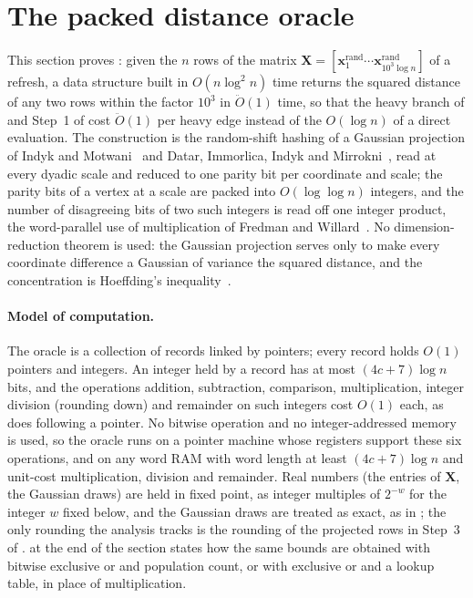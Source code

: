 \documentclass[11pt]{article}
\theoremstyle{remark}
\newcommand{\xx}{\mathbf x}
\newcommand{\XX}{\mathbf X}
\newcommand{\xxrand}{\xx^{\mathrm{rand}}}
\newcommand{\Odouble}{\ddot{O}}
\begin{document}



\clearpage
\appendix
\section{The packed distance oracle}\label{sec:packed}

This section proves : given the $n$ rows of the matrix
$\XX=[\xxrand_1\cdots\xxrand_{10^{3}\log n}]$ of a refresh, a data structure
built in $O(n\log^{2}n)$ time returns the squared distance of any two rows
within the factor $10^{3}$ in $\Odouble(1)$ time, so that the heavy branch of
 and Step~1 of  cost $\Odouble(1)$ per heavy
edge instead of the $O(\log n)$ of a direct evaluation.
The construction is the random-shift hashing of a Gaussian projection of
Indyk and Motwani~\cite{IM98:conf} and Datar, Immorlica, Indyk and
Mirrokni~\cite{DIIM04:conf}, read at every dyadic scale and reduced to
one parity bit per coordinate and scale; the parity bits of a vertex at a
scale are packed into $O(\log\log n)$ integers, and the number of
disagreeing bits of two such integers is read off one integer product,
the word-parallel use of multiplication of Fredman and
Willard~\cite{FW93:journal}.
No dimension-reduction theorem is used: the Gaussian projection serves
only to make every coordinate difference a Gaussian of variance the
squared distance, and the concentration is Hoeffding's
inequality~\cite{H63:journal}.

\paragraph{Model of computation.}
The oracle is a collection of records linked by pointers; every record
holds $O(1)$ pointers and integers.
An integer held by a record has at most $(4c+7)\log n$ bits, and the
operations addition, subtraction, comparison, multiplication, integer
division (rounding down) and remainder on such integers cost $O(1)$ each,
as does following a pointer.
No bitwise operation and no integer-addressed memory is used, so the
oracle runs on a pointer machine whose registers support these six
operations, and on any word RAM with word length at least $(4c+7)\log n$
and unit-cost multiplication, division and remainder.
Real numbers (the entries of $\XX$, the Gaussian draws) are held in fixed
point, as integer multiples of $2^{-w}$ for the integer $w$ fixed below, and
the Gaussian draws are treated as exact, as in ; the
only rounding the analysis tracks is the rounding of the projected rows
in Step~3 of .
 at the end of the section states how the same
bounds are obtained with bitwise exclusive or and population count, or
with exclusive or and a lookup table, in place of multiplication.
\end{document}
